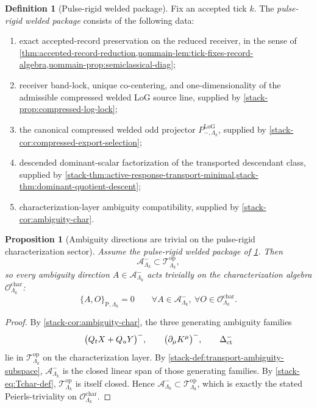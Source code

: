 \documentclass[11pt]{article}
\newtheorem{proposition}[theorem]{Proposition}
\theoremstyle{definition}
\newtheorem{definition}[theorem]{Definition}
\begin{document}
\begin{definition}[Pulse-rigid welded package]
\label{def:pulse-rigid-package}
Fix an accepted tick \(k\).
The \emph{pulse-rigid welded package} consists of the following data:
\begin{enumerate}[leftmargin=2em,label=(P\arabic*)]
\item exact accepted-record preservation on the reduced receiver, in the sense of
  \cref{thm:accepted-record-reduction,uommain-lem:tick-fixes-record-algebra,uommain-prop:semiclassical-diag};
\item receiver band-lock, unique co-centering, and one-dimensionality of the admissible compressed
  welded LoG source line, supplied by \cref{stack-prop:compressed-log-lock};
\item the canonical compressed welded odd projector
  \(P^{\mathrm{LoG}}_{-,\Lambda_k}\), supplied by
  \cref{stack-cor:compressed-export-selection};
\item descended dominant-scalar factorization of the transported descendant class, supplied by
  \cref{stack-thm:active-response-transport-minimal,stack-thm:dominant-quotient-descent};
\item characterization-layer ambiguity compatibility, supplied by
  \cref{stack-cor:ambiguity-char}.
\end{enumerate}
\end{definition}

\begin{proposition}[Ambiguity directions are trivial on the pulse-rigid characterization sector]
\label{prop:pulse-rigid-char-triviality}
Assume the pulse-rigid welded package of \cref{def:pulse-rigid-package}.
Then
\[
\mathcal A^-_{\Lambda_k}\subset \mathcal T^{\mathrm{op}}_{\Lambda_k},
\]
so every ambiguity direction \(A\in\mathcal A^-_{\Lambda_k}\) acts trivially on the
characterization algebra \(\mathcal O^{\mathrm{char}}_{\Lambda_k}\):
\[
\{A,O\}_{\mathrm P,\Lambda_k}=0
\qquad
\forall A\in\mathcal A^-_{\Lambda_k},\ \forall O\in\mathcal O^{\mathrm{char}}_{\Lambda_k}.
\]
\end{proposition}

\begin{proof}
By \cref{stack-cor:ambiguity-char}, the three generating ambiguity families
\[
\big(Q_tX+Q_uY\big)^-,\qquad
\big(\partial_\mu K^\mu\big)^-,\qquad
\Delta^-_{\rm ct}
\]
lie in \(\mathcal T^{\mathrm{op}}_{\Lambda_k}\) on the characterization layer.
By \cref{stack-def:transport-ambiguity-subspace},
\(\mathcal A^-_{\Lambda_k}\) is the closed linear span of those generating families.
By \eqref{stack-eq:Tchar-def}, \(\mathcal T^{\mathrm{op}}_{\Lambda_k}\) is itself closed.
Hence \(\mathcal A^-_{\Lambda_k}\subset\mathcal T^{\mathrm{op}}_{\Lambda_k}\), which is exactly the
stated Peierls-triviality on \(\mathcal O^{\mathrm{char}}_{\Lambda_k}\).
\end{proof}
\end{document}
